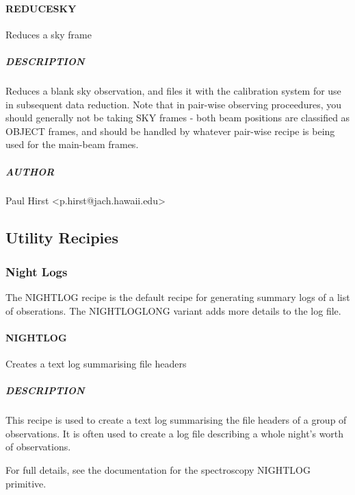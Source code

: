 \documentclass[twoside,11pt]{article}
\renewcommand{\_}{\texttt{\symbol{95}}}
\begin{document}
\paragraph*{REDUCE\_SKY\label{REDUCE_SKY}}

Reduces a sky frame

\subparagraph*{DESCRIPTION\label{REDUCE_SKY_DESCRIPTION}}

Reduces a blank sky observation, and files it with the calibration
system for use in subsequent data reduction. Note that in pair-wise
observing proceedures, you should generally not be taking SKY frames -
both beam positions are classified as OBJECT frames, and should be
handled by whatever pair-wise recipe is being used for the main-beam
frames.

\subparagraph*{AUTHOR\label{REDUCE_SKY_AUTHOR}}

Paul Hirst <p.hirst@jach.hawaii.edu>


\subsection{Utility Recipies}

\subsubsection{Night Logs}

The NIGHT\_LOG recipe is the default recipe for generating summary
logs of a list of obserations. The NIGHT\_LOG\_LONG variant adds more
details to the log file.

\paragraph*{NIGHT\_LOG\label{NIGHT_LOG}}

Creates a text log summarising file headers

\subparagraph*{DESCRIPTION\label{NIGHT_LOG_DESCRIPTION}}

This recipe is used to create a text log summarising the file headers
of a group of observations. It is often used to create a log file
describing a whole night's worth of observations.



For full details, see the documentation for the spectroscopy
\_NIGHT\_LOG primitive.
\end{document}
